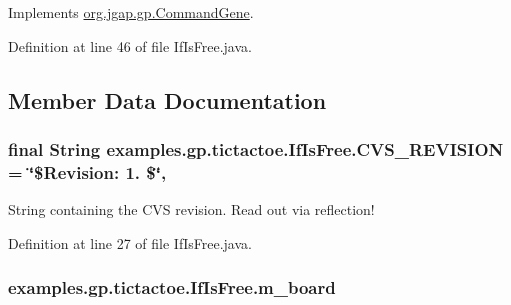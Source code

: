 Implements \hyperlink{classorg_1_1jgap_1_1gp_1_1_command_gene_a236141d99059da808afe7a9217e411c7}{org.\-jgap.\-gp.\-Command\-Gene}.



Definition at line 46 of file If\-Is\-Free.\-java.



\subsection{Member Data Documentation}
\hypertarget{classexamples_1_1gp_1_1tictactoe_1_1_if_is_free_a89f6f18bc2e3c73a778ef5fbc3cb8eca}{
\subsubsection[{C\-V\-S\-\_\-\-R\-E\-V\-I\-S\-I\-O\-N}]{\setlength{\rightskip}{0pt plus 5cm}final String examples.\-gp.\-tictactoe.\-If\-Is\-Free.\-C\-V\-S\-\_\-\-R\-E\-V\-I\-S\-I\-O\-N = \char`\"{}\$Revision\-: 1. \$\char`\"{}\hspace{0.3cm}{\ttfamily [static]}, {\ttfamily [private]}}}\label{classexamples_1_1gp_1_1tictactoe_1_1_if_is_free_a89f6f18bc2e3c73a778ef5fbc3cb8eca}
String containing the C\-V\-S revision. Read out via reflection! 

Definition at line 27 of file If\-Is\-Free.\-java.

\hypertarget{classexamples_1_1gp_1_1tictactoe_1_1_if_is_free_a0114d222769e96e765d2fc978a793cb0}{
\subsubsection[{m\-\_\-board}]{ examples.\-gp.\-tictactoe.\-If\-Is\-Free.\-m\-\_\-board\hspace{0.3cm}{\ttfamily [private]}}}\label{classexamples_1_1gp_1_1tictactoe_1_1_if_is_free_a0114d222769e96e765d2fc978a793cb0}


